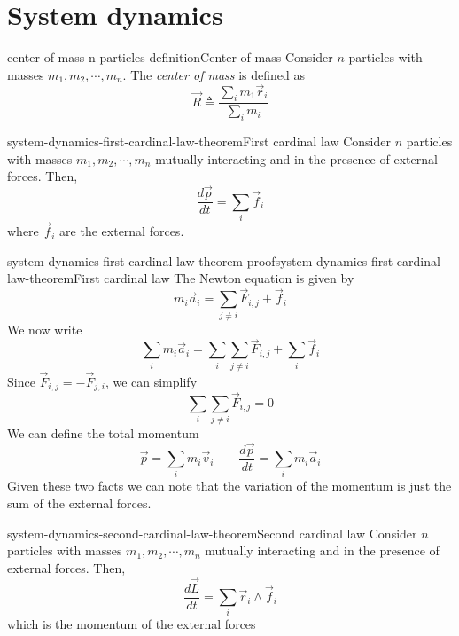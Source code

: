 \documentclass[preview]{standalone}
\begin{document}
\genpage

\section{System dynamics}

\begin{snippetdefinition}{center-of-mass-n-particles-definition}{Center of mass}
    Consider \(n\) particles with masses \(m_1, m_2, \cdots, m_n\).
    The \emph{center of mass} is defined as
    \[
        \vec{R} \triangleq \frac{\sum_i m_1\vec{r}_i}{\sum_i m_i}
    \]
\end{snippetdefinition}

\begin{snippettheorem}{system-dynamics-first-cardinal-law-theorem}{First cardinal law}
    Consider \(n\) particles with masses \(m_1, m_2, \cdots, m_n\) mutually interacting and in the presence of
    external forces. Then,
    \[
        \frac{d\vec{p}}{dt} = \sum_i \vec{f}_i
    \]
    where \(\vec{f}_i\) are the external forces.
\end{snippettheorem}

\begin{snippetproof}{system-dynamics-first-cardinal-law-theorem-proof}{system-dynamics-first-cardinal-law-theorem}{First cardinal law}
    The Newton equation is given by
    \[
        m_i\vec{a}_i = \sum_{j \neq i} \vec{F}_{i,j} + \vec{f}_{i}
    \]
    We now write
    \[
        \sum_i m_i\vec{a}_i = \sum_i \sum_{j \neq i} \vec{F}_{i,j} + \sum_i \vec{f}_i
    \]
    Since \(\vec{F}_{i,j} = -\vec{F}_{j,i}\), we can simplify
    \[
        \sum_i \sum_{j \neq i} \vec{F}_{i,j} = 0
    \]
    We can define the total momentum
    \[
        \vec{p} = \sum_i m_i\vec{v}_i \qquad \frac{d\vec{p}}{dt} = \sum_i m_i\vec{a}_i
    \]
    Given these two facts we can note that the variation of the momentum is just the sum
    of the external forces.
\end{snippetproof}

\begin{snippettheorem}{system-dynamics-second-cardinal-law-theorem}{Second cardinal law}
    Consider \(n\) particles with masses \(m_1, m_2, \cdots, m_n\) mutually interacting and in the presence of
    external forces. Then,
    \[
        \frac{d\vec{L}}{dt} = \sum_i \vec{r}_i \wedge \vec{f}_i
    \]
    which is the momentum of the external forces
\end{snippettheorem}
\end{document}

